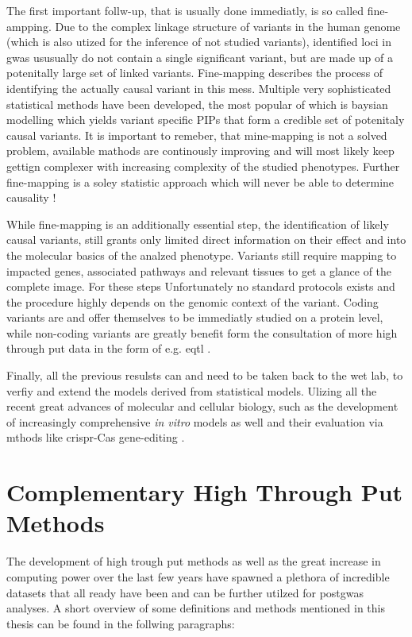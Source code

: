     The first important follw-up, that is usually done immediatly, is so called fine-ampping. Due to the complex linkage structure of variants in the human genome (which is also utized for the inference of not studied variants), identified loci in \ac{gwas} ususually do not contain a single significant variant, but are made up of a potenitally large set of linked variants. Fine-mapping describes the process of identifying the actually causal variant in this mess. Multiple very sophisticated statistical methods have been developed, the most popular of which is baysian modelling which yields variant specific PIPs that form a credible set of potenitaly causal variants. It is important to remeber, that mine-mapping is not a solved problem, available mathods are continously improving and will most likely keep gettign complexer with increasing complexity of the studied phenotypes. Further fine-mapping is a soley statistic approach which will never be able to determine causality \cite{schaidGenomewideAssociationsCandidate2018, uffelmannGenomewideAssociationStudies2021}!

    While fine-mapping is an additionally essential step, the identification of likely causal variants, still grants only limited direct information on their effect and into the molecular basics of the analzed phenotype. Variants still require mapping to impacted genes, associated pathways and relevant tissues to get a glance of the complete image. For these steps Unfortunately no standard protocols exists and the procedure highly depends on the genomic context of the variant. Coding variants are and offer themselves to be immediatly studied on a protein level, while non-coding variants are greatly benefit form the consultation of more high through put data in the form of e.g. \ac{eqtl} \cite{uffelmannGenomewideAssociationStudies2021}.

    Finally, all the previous resulsts can and need to be taken back to the wet lab, to verfiy and extend the models derived from statistical models. Ulizing all the recent great advances of molecular and cellular biology, such as the development of increasingly comprehensive \textit{in vitro} models as well and their evaluation via mthods like \ac{crispr}-Cas gene-editing \cite{lichouFunctionalStudiesGWAS2020}.


\section{Complementary High Through Put Methods}
\label{sec:bioinformatics}
The development of high trough put methods as well as the great increase in computing power over the last few years have spawned a plethora of incredible datasets that all ready have been and can be further utilzed for post\ac{gwas} analyses. A short overview of some definitions and methods mentioned in this thesis can be found in the follwing paragraphs:

